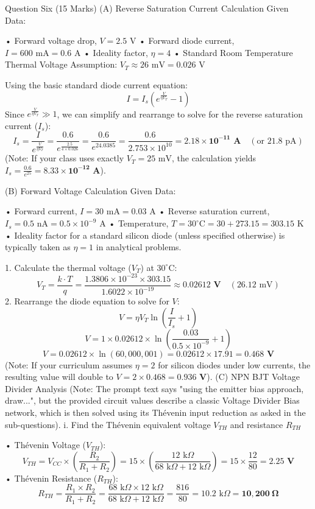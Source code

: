 Question Six (15 Marks)
(A) Reverse Saturation Current Calculation
Given Data:


• Forward voltage drop, $V = 2.5\text{ V}$
• Forward diode current, $I = 600\text{ mA} = 0.6\text{ A}$
• Ideality factor, $\eta = 4$
• Standard Room Temperature Thermal Voltage Assumption: $V_T \approx 26\text{ mV} = 0.026\text{ V}$

Using the basic standard diode current equation:
$$I = I_s \left( e^{\frac{V}{\eta V_T}} - 1 \right)$$ 
Since $e^{\frac{V}{\eta V_T}} \gg 1$, we can simplify and rearrange to solve for the reverse saturation current ($I_s$):
$$I_s = \frac{I}{e^{\frac{V}{\eta V_T}}} = \frac{0.6}{e^{\frac{2.5}{4 \times 0.026}}} = \frac{0.6}{e^{24.0385}} = \frac{0.6}{2.753 \times 10^{10}} = \mathbf{2.18 \times 10^{-11}\text{ A}} \quad (\text{or } 21.8\text{ pA})$$ 
(Note: If your class uses exactly $V_T = 25\text{ mV}$, the calculation yields $I_s = \frac{0.6}{e^{25}} = \mathbf{8.33 \times 10^{-12}\text{ A}}$).

(B) Forward Voltage Calculation
Given Data:


• Forward current, $I = 30\text{ mA} = 0.03\text{ A}$
• Reverse saturation current, $I_s = 0.5\text{ nA} = 0.5 \times 10^{-9}\text{ A}$
• Temperature, $T = 30^\circ\text{C} = 30 + 273.15 = 303.15\text{ K}$
• Ideality factor for a standard silicon diode (unless specified otherwise) is typically taken as $\eta = 1$ in analytical problems.


1. Calculate the thermal voltage ($V_T$) at $30^\circ\text{C}$:
$$V_T = \frac{k \cdot T}{q} = \frac{1.3806 \times 10^{-23} \times 303.15}{1.6022 \times 10^{-19}} \approx \mathbf{0.02612\text{ V}} \quad (26.12\text{ mV})$$ 
2. Rearrange the diode equation to solve for $V$:
$$V = \eta V_T \ln\left(\frac{I}{I_s} + 1\right)$$ 
$$V = 1 \times 0.02612 \times \ln\left(\frac{0.03}{0.5 \times 10^{-9}} + 1\right)$$ 
$$V = 0.02612 \times \ln(60,000,001) = 0.02612 \times 17.91 = \mathbf{0.468\text{ V}}$$ 
(Note: If your curriculum assumes $\eta = 2$ for silicon diodes under low currents, the resulting value will double to $V = 2 \times 0.468 = \mathbf{0.936\text{ V}}$).
(C) NPN BJT Voltage Divider Analysis
(Note: The prompt text says "using the emitter bias approach, draw...", but the provided circuit values describe a classic Voltage Divider Bias network, which is then solved using its Thévenin input reduction as asked in the sub-questions).
i. Find the Thévenin equivalent voltage $V_{TH}$ and resistance $R_{TH}$


• Thévenin Voltage ($V_{TH}$):
$$V_{TH} = V_{CC} \times \left( \frac{R_2}{R_1 + R_2} \right) = 15 \times \left( \frac{12\text{ k}\Omega}{68\text{ k}\Omega + 12\text{ k}\Omega} \right) = 15 \times \frac{12}{80} = \mathbf{2.25\text{ V}}$$ 
• Thévenin Resistance ($R_{TH}$):
$$R_{TH} = \frac{R_1 \times R_2}{R_1 + R_2} = \frac{68\text{ k}\Omega \times 12\text{ k}\Omega}{68\text{ k}\Omega + 12\text{ k}\Omega} = \frac{816}{80} = 10.2\text{ k}\Omega = \mathbf{10,200\ \Omega}$$ 


